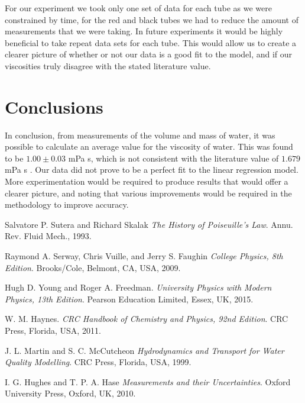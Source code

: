 \documentclass[twocolumn]{revtex4}
\begin{document}
For our experiment we took only one set of data for each tube as we were constrained by time, for the red and black tubes we had to reduce the amount of measurements that we were taking. In future experiments it would be highly beneficial to take repeat data sets for each tube. This would allow us to create a clearer picture of whether or not our data is a good fit to the model, and if our viscosities truly disagree with the stated literature value. 

\vspace{-5ex}
\section{Conclusions}
\vspace{-2ex}
In conclusion, from measurements of the volume and mass of water, it was possible to calculate an average value for the viscosity of water. This was found to be $1.00 \pm 0.03$ mPa s, which is not consistent with the literature value of $1.679$  mPa {s} \cite{crc}. Our data did not prove to be a perfect fit to the linear regression model. More experimentation would be required to produce results that would offer a clearer picture, and noting that various improvements would be required in the methodology to improve accuracy.

\begin{thebibliography}{5}
	Salvatore P. Sutera and Richard Skalak
	\textit{The History of Poiseuille's Law}.
	Annu. Rev. Fluid Mech., 1993.
	
	Raymond A. Serway, Chris Vuille, and Jerry S. Faughin
	\textit{College Physics, 8th Edition}.
	Brooks/Cole, Belmont, CA, USA, 2009.

	Hugh D. Young and Roger A. Freedman.
	\textit{University Physics with Modern Physics, 13th Edition}. 
	Pearson Education Limited, Essex, UK, 2015.
	
	W. M. Haynes.
	\textit{CRC Handbook of Chemistry and Physics, 92nd Edition}. 
	CRC Press, Florida, USA, 2011.
	
	J. L. Martin and S. C. McCutcheon
	\textit{Hydrodynamics and Transport for Water Quality Modelling}. 
	CRC Press, Florida, USA, 1999.
	
	I. G. Hughes and T. P. A. Hase
	\textit{Measurements and their Uncertainties}. 
	Oxford University Press, Oxford, UK, 2010.
	
\end{thebibliography}
\clearpage
\end{document}
